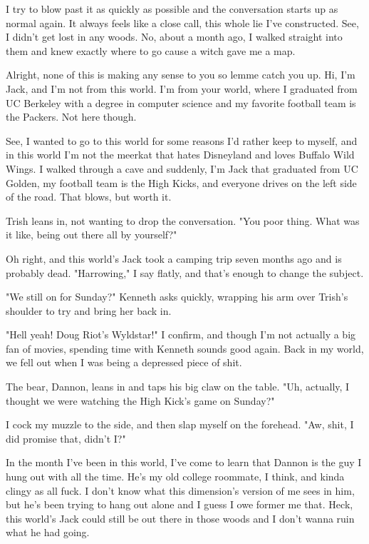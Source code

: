 I try to blow past it as quickly as possible and the conversation starts up as normal again. It always feels like a close call, this whole lie I've constructed. See, I didn't get lost in any woods. No, about a month ago, I walked straight into them and knew exactly where to go cause a witch gave me a map.

Alright, none of this is making any sense to you so lemme catch you up. Hi, I'm Jack, and I'm not from this world. I'm from your world, where I graduated from UC Berkeley with a degree in computer science and my favorite football team is the Packers. Not here though.

See, I wanted to go to this world for some reasons I'd rather keep to myself, and in this world I'm not the meerkat that hates Disneyland and loves Buffalo Wild Wings. I walked through a cave and suddenly, I'm Jack that graduated from UC Golden, my football team is the High Kicks, and everyone drives on the left side of the road. That blows, but worth it.

Trish leans in, not wanting to drop the conversation. "You poor thing. What was it like, being out there all by yourself?"

Oh right, and this world's Jack took a camping trip seven months ago and is probably dead. "Harrowing," I say flatly, and that's enough to change the subject.

"We still on for Sunday?" Kenneth asks quickly, wrapping his arm over Trish's shoulder to try and bring her back in.

"Hell yeah! Doug Riot's Wyldstar!" I confirm, and though I'm not actually a big fan of movies, spending time with Kenneth sounds good again. Back in my world, we fell out when I was being a depressed piece of shit.

The bear, Dannon, leans in and taps his big claw on the table. "Uh, actually, I thought we were watching the High Kick's game on Sunday?"

I cock my muzzle to the side, and then slap myself on the forehead. "Aw, shit, I did promise that, didn't I?"

In the month I've been in this world, I've come to learn that Dannon is the guy I hung out with all the time. He's my old college roommate, I think, and kinda clingy as all fuck. I don't know what this dimension's version of me sees in him, but he's been trying to hang out alone and I guess I owe former me that. Heck, this world's Jack could still be out there in those woods and I don't wanna ruin what he had going.

